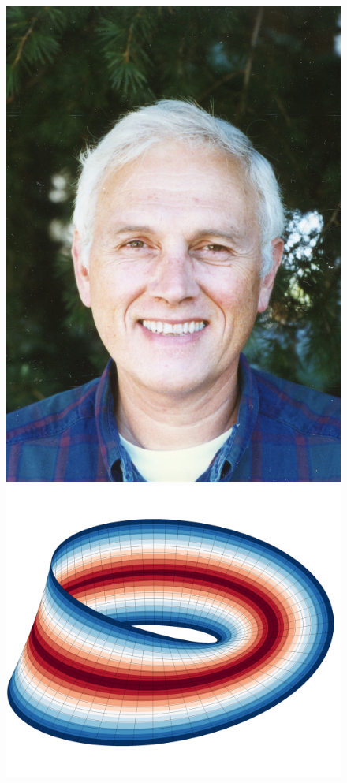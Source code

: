 \documentclass[aspectratio=169,xcolor=dvipsnames,11pt]{beamer}
\begin{document}
\begin{frame}
\begin{minipage}{0.35\linewidth}
\begin{figure}
\begin{minipage}[b]{0.44\textwidth}
    \includegraphics[width=\linewidth]{figures/mgcrandall.jpg}
  \end{minipage}\vspace{-2ex}
    \includegraphics[width=0.7\linewidth]{figures/eikonal_mobius.png}
\end{figure}
\end{minipage}
\end{frame}
\end{document}
